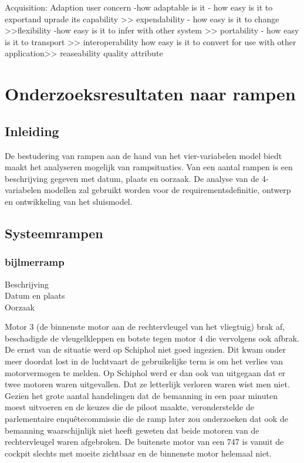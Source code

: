 Acquisition: Adaption
user concern
-how adaptable is it
- how easy is it to exportand uprade its capability >> expendability
- how easy is it to change >>flexibility
-how easy is it to infer with other system >> portability
- how easy is it to transport >> interoperability
how easy is it to convert for use with other application>> reaseability
quality attribute




\section{Onderzoeksresultaten naar rampen}

\subsection{Inleiding}
De bestudering van rampen aan de hand van het vier-variabelen model biedt maakt het analyseren mogelijk van rampsituaties. Van een aantal rampen is een beschrijving gegeven met datum, plaats en oorzaak. De analyse van de 4-variabelen modellen zal gebruikt worden voor de requirementsdefinitie, ontwerp en ontwikkeling van het sluismodel. 
\subsection{Systeemrampen}
\subsubsection{bijlmerramp}

\begin{description}
	\item[Beschrijving]
	\item[Datum en plaats] 
	\item[Oorzaak]
\end{description}
Motor 3 (de binnenste motor aan de rechtervleugel van het vliegtuig) brak af, beschadigde de vleugelkleppen en botste tegen motor 4 die vervolgens ook afbrak.
De ernst van de situatie werd op Schiphol niet goed ingezien. Dit kwam onder meer doordat lost in de luchtvaart de gebruikelijke term is om het verlies van motorvermogen te melden. Op Schiphol werd er dan ook van uitgegaan dat er twee motoren waren uitgevallen. Dat ze letterlijk verloren waren wist men niet. Gezien het grote aantal handelingen dat de bemanning in een paar minuten moest uitvoeren en de keuzes die de piloot maakte, veronderstelde de parlementaire enquêtecommissie die de ramp later zou onderzoeken dat ook de bemanning waarschijnlijk niet heeft geweten dat beide motoren van de rechtervleugel waren afgebroken. De buitenste motor van een 747 is vanuit de cockpit slechts met moeite zichtbaar en de binnenste motor helemaal niet.

